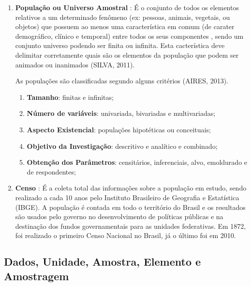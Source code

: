 \begin{enumerate}
  \item \textbf{População ou Universo Amostral} : É o conjunto de todos os elementos relativos
  a um determinado fenômeno (ex: pessoas, animais, vegetais, ou objetos) que possuem ao menos uma característica em comum (de carater demográfico, clínico e temporal)
  entre todos os seus componentes , sendo um conjunto universo podendo ser
  finita ou infinita. Esta cacterística deve delimitar corretamente quais
  são os elementos da população que podem ser animados ou inanimados (SILVA, 2011).\vskip0.3cm

 As populações são classificadas segundo alguns critérios (AIRES, 2013).
 \begin{enumerate}
   \item \textbf{Tamanho}: finitas e infinitas;
   \item \textbf{Número de variáveis}: univariada, bivariadas e multivariadas;
   \item \textbf{Aspecto Existencial}: populações hipotéticas ou conceituais;
   \item \textbf{Objetivo da Investigação}: descritivo e analítico e combinado;
   \item \textbf{Obtenção dos Parâmetros}: censitários, inferenciais, alvo, emoldurado e de respondentes;
 \end{enumerate}



  \item \textbf{Censo} : É a coleta total das informações sobre a
  população em estudo, sendo realizado a cada 10 anos pelo Instituto
  Brasileiro de Geografia e Estatística (IBGE). A população é contada
  em todo o território do Brasil e os resultados são usados
  pelo governo no desenvolvimento de políticas públicas e na
  destinação dos fundos governamentais para as unidades federativas.
  Em 1872, foi realizado o primeiro Censo Nacional no Brasil, já o último foi em 2010.
\end{enumerate}

\subsection{Dados, Unidade, Amostra, Elemento e Amostragem}

